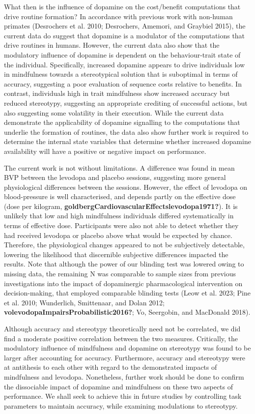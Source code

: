 \documentclass{article}
\begin{document}
What then is the influence of dopamine on the cost/benefit computations
that drive routine formation? In accordance with previous work with
non-human primates (Desrochers et al. 2010; Desrochers, Amemori, and
Graybiel 2015), the current data do suggest that dopamine is a modulator
of the computations that drive routines in humans. However, the current
data also show that the modulatory influence of dopamine is dependent on
the behaviour-trait state of the individual. Specifically, increased
dopamine appears to drive individuals low in mindfulness towards a
stereotypical solution that is suboptimal in terms of accuracy,
suggesting a poor evaluation of sequence costs relative to benefits. In
contrast, individuals high in trait mindfulness show increased accuracy
but reduced stereotypy, suggesting an appropriate crediting of
successful actions, but also suggesting some volatility in their
execution. While the current data demonstrate the applicability of
dopamine signalling to the computations that underlie the formation of
routines, the data also show further work is required to determine the
internal state variables that determine whether increased dopamine
availability will have a positive or negative impact on performance.

The current work is not without limitations. A difference was found in
mean BVP between the levodopa and placebo sessions, suggesting more
general physiological differences between the sessions. However, the
effect of levodopa on blood-pressure is well characterised, and depends
partly on the effective dose (dose per kilogram,
\textbf{goldbergCardiovascularEffectslevodopa1971?}). It is unlikely
that low and high mindfulness individuals differed systematically in
terms of effective dose. Participants were also not able to detect
whether they had received levodopa or placebo above what would be
expected by chance. Therefore, the physiological changes appeared to not
be subjectively detectable, lowering the likelihood that discernible
subjective differences impacted the results. Note that although the
power of our blinding test was lowered owing to missing data, the
remaining N was comparable to sample sizes from previous investigations
into the impact of dopaminergic pharmacological intervention on
decision-making, that employed comparable blinding tests (Leow et al.
2023; Pine et al. 2010; Wunderlich, Smittenaar, and Dolan 2012;
\textbf{volevodopaImpairsProbabilistic2016?}; Vo, Seergobin, and
MacDonald 2018).

Although accuracy and stereotypy theoretically need not be correlated,
we did find a moderate positive correlation between the two measures.
Critically, the modulatory influence of mindfulness and dopamine on
stereotypy was found to be larger after accounting for accuracy.
Furthermore, accuracy and stereotypy were at antithesis to each other
with regard to the demonstrated impacts of mindfulness and levodopa.
Nonetheless, further work should be done to confirm the dissociable
impact of dopamine and mindfulness on these two aspects of performance.
We shall seek to achieve this in future studies by controlling task
parameters to maintain accuracy, while examining modulations to
stereotypy.
\end{document}
